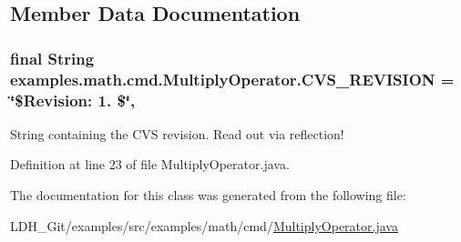\subsection{Member Data Documentation}
\hypertarget{classexamples_1_1math_1_1cmd_1_1_multiply_operator_a4cbf1da0dd6f1e04a2c1cd969430abfa}{
\subsubsection[{C\-V\-S\-\_\-\-R\-E\-V\-I\-S\-I\-O\-N}]{\setlength{\rightskip}{0pt plus 5cm}final String examples.\-math.\-cmd.\-Multiply\-Operator.\-C\-V\-S\-\_\-\-R\-E\-V\-I\-S\-I\-O\-N = \char`\"{}\$Revision\-: 1. \$\char`\"{}\hspace{0.3cm}{\ttfamily [static]}, {\ttfamily [private]}}}\label{classexamples_1_1math_1_1cmd_1_1_multiply_operator_a4cbf1da0dd6f1e04a2c1cd969430abfa}
String containing the C\-V\-S revision. Read out via reflection! 

Definition at line 23 of file Multiply\-Operator.\-java.



The documentation for this class was generated from the following file\-:\begin{DoxyCompactItemize}
\item 
L\-D\-H\-\_\-\-Git/examples/src/examples/math/cmd/\hyperlink{_multiply_operator_8java}{Multiply\-Operator.\-java}\end{DoxyCompactItemize}
